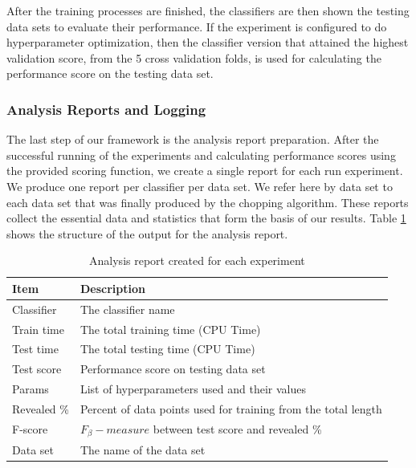 After the training processes are finished, the classifiers are then shown the testing data sets to evaluate their performance.
If the experiment is configured to do hyperparameter optimization,
then the classifier version that attained the highest validation score, from the 5 cross validation folds, is used for calculating the performance score on the testing data set.


\subsubsection{Analysis Reports and Logging}
\label{SubsectionAnalysisReport}
The last step of our framework is the analysis report preparation.
After the successful running of the experiments and calculating performance scores using the provided scoring function, we create a single report for each run experiment.
We produce one report per classifier per data set.
We refer here by data set to each data set that was finally produced by the chopping algorithm.
These reports collect the essential data and statistics that form the basis of our results.
Table \ref{TableAnalysisReport} shows the structure of the output for the analysis report.

\begin{table}
  \setlength\extrarowheight{2pt} %
  \begin{tabularx}{\textwidth}{|X|X|}
  \hline
  \textbf{Item} & \textbf{Description} \\ \hline
    Classifier                 & The classifier name                                             \\ \hline
    Train time                 & The total training time (CPU Time)                              \\ \hline
    Test time                  & The total testing time (CPU Time)                               \\ \hline
    Test score                 & Performance score on testing data set                           \\ \hline
    Params                     & List of hyperparameters used and their values                   \\ \hline
    Revealed \%                & Percent of data points used for training from the total length  \\ \hline
    F-score                    & $F_{\beta}-measure$ between test score and revealed \%          \\ \hline
    Data set                   & The name of the data set                                        \\ \hline
  \end{tabularx}
  \caption{Analysis report created for each experiment}
  \label{TableAnalysisReport}
\end{table}

